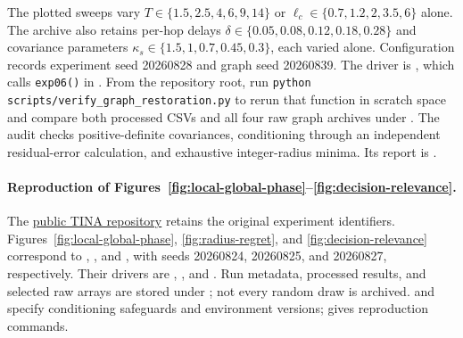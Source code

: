 The plotted sweeps vary $T\in\{1.5,2.5,4,6,9,14\}$ or
$\ell_c\in\{0.7,1.2,2,3.5,6\}$ alone. The archive also retains
per-hop delays $\delta\in\{0.05,0.08,0.12,0.18,0.28\}$ and covariance parameters
$\kappa_s\in\{1.5,1,0.7,0.45,0.3\}$, each varied alone.
Configuration  records experiment
seed 20260828 and graph seed 20260839. The driver is
, which calls
\texttt{exp06()} in .
From the repository root, run \texttt{python scripts/verify\_graph\_restoration.py}
to rerun that function in scratch space and compare both processed CSVs and
all four raw graph archives under .
The audit checks positive-definite covariances, conditioning through an
independent residual-error calculation, and exhaustive integer-radius minima.
Its report is .

\paragraph{Reproduction of Figures~\ref{fig:local-global-phase}--\ref{fig:decision-relevance}.}
The \href{https://github.com/ANRGUSC/TINA}{public TINA repository} retains
the original experiment identifiers. Figures~\ref{fig:local-global-phase},
\ref{fig:radius-regret}, and \ref{fig:decision-relevance} correspond to
,
, and
, with seeds 20260824, 20260825,
and 20260827, respectively. Their drivers are
,
, and
.
Run metadata, processed results, and selected raw arrays are stored under
; not every random draw is archived.
 and 
specify conditioning safeguards and environment versions;
 gives reproduction commands.


